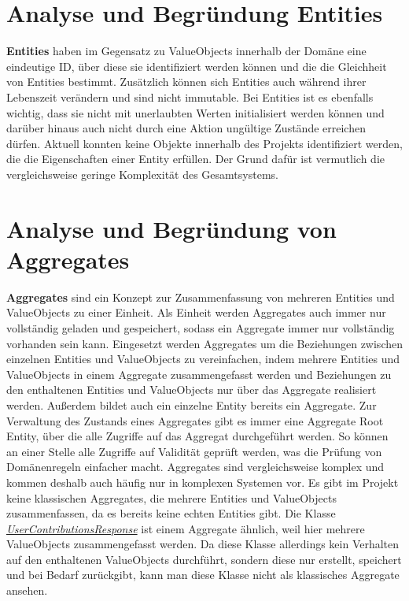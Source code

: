\newpage

\section{Analyse und Begründung Entities}

\textbf{Entities} haben im Gegensatz zu ValueObjects innerhalb der Domäne eine eindeutige ID, über diese sie identifiziert werden können und die die Gleichheit von Entities bestimmt.
Zusätzlich können sich Entities auch während ihrer Lebenszeit verändern und sind nicht immutable.
Bei Entities ist es ebenfalls wichtig, dass sie nicht mit unerlaubten Werten initialisiert werden können und darüber hinaus auch nicht durch eine Aktion ungültige Zustände erreichen dürfen.
\newline
Aktuell konnten keine Objekte innerhalb des Projekts identifiziert werden, die die Eigenschaften einer Entity erfüllen.
Der Grund dafür ist vermutlich die vergleichsweise geringe Komplexität des Gesamtsystems.

\newpage

\section{Analyse und Begründung von Aggregates}

\textbf{Aggregates} sind ein Konzept zur Zusammenfassung von mehreren Entities und ValueObjects zu einer Einheit. 
Als Einheit werden Aggregates auch immer nur vollständig geladen und gespeichert, sodass ein Aggregate immer nur vollständig vorhanden sein kann.
Eingesetzt werden Aggregates um die Beziehungen zwischen einzelnen Entities und ValueObjects zu vereinfachen, indem mehrere Entities und ValueObjects in einem Aggregate zusammengefasst werden und Beziehungen zu den enthaltenen Entities und ValueObjects nur über das Aggregate realisiert werden. 
Außerdem bildet auch ein einzelne Entity bereits ein Aggregate.
Zur Verwaltung des Zustands eines Aggregates gibt es immer eine Aggregate Root Entity, über die alle Zugriffe auf das Aggregat durchgeführt werden.
So können an einer Stelle alle Zugriffe auf Validität geprüft werden, was die Prüfung von Domänenregeln einfacher macht.
\newline
Aggregates sind vergleichsweise komplex und kommen deshalb auch häufig nur in komplexen Systemen vor.
Es gibt im Projekt keine klassischen Aggregates, die mehrere Entities und ValueObjects zusammenfassen, da es bereits keine echten Entities gibt.
Die Klasse \textit{\href{https://github.com/lukaspanni/OpenSourceStats/blob/main/app/src/main/java/de/lukaspanni/opensourcestats/data/UserContributionsResponse.java}{UserContributionsResponse}} ist einem Aggregate ähnlich, weil hier mehrere ValueObjects zusammengefasst werden. 
Da diese Klasse allerdings kein Verhalten auf den enthaltenen ValueObjects durchführt, sondern diese nur erstellt, speichert und bei Bedarf zurückgibt, kann man diese Klasse nicht als klassisches Aggregate ansehen.

